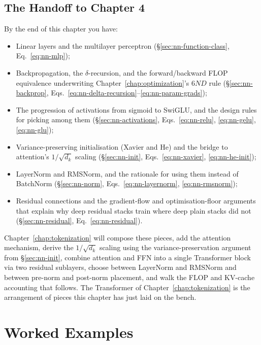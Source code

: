 \subsection{The Handoff to Chapter 4}

By the end of this chapter you have:

\begin{itemize}
  \item Linear layers and the multilayer perceptron
        (\S\ref{sec:nn-function-class}, Eq.~\ref{eq:nn-mlp});
  \item Backpropagation, the $\delta$-recursion, and the
        forward/backward FLOP equivalence underwriting
        Chapter~\ref{chap:optimization}'s $6ND$ rule
        (\S\ref{sec:nn-backprop},
        Eqs.~\ref{eq:nn-delta-recursion}--\ref{eq:nn-param-grads});
  \item The progression of activations from sigmoid to SwiGLU,
        and the design rules for picking among them
        (\S\ref{sec:nn-activations}, Eqs.~\ref{eq:nn-relu},
        \ref{eq:nn-gelu}, \ref{eq:nn-glu});
  \item Variance-preserving initialisation (Xavier and He) and
        the bridge to attention's $1/\sqrt{d_k}$ scaling
        (\S\ref{sec:nn-init}, Eqs.~\ref{eq:nn-xavier},
        \ref{eq:nn-he-init});
  \item LayerNorm and RMSNorm, and the rationale for using them
        instead of BatchNorm
        (\S\ref{sec:nn-norm}, Eqs.~\ref{eq:nn-layernorm},
        \ref{eq:nn-rmsnorm});
  \item Residual connections and the gradient-flow and
        optimisation-floor arguments that explain why deep
        residual stacks train where deep plain stacks did not
        (\S\ref{sec:nn-residual}, Eq.~\ref{eq:nn-residual}).
\end{itemize}

Chapter~\ref{chap:tokenization} will compose these pieces, add the attention
mechanism, derive the $1/\sqrt{d_k}$ scaling using the
variance-preservation argument from \S\ref{sec:nn-init},
combine attention and FFN into a single Transformer block via
two residual sublayers, choose between LayerNorm and RMSNorm and
between pre-norm and post-norm placement, and walk the FLOP and
KV-cache accounting that follows. The Transformer of Chapter~\ref{chap:tokenization}
is the arrangement of pieces this chapter has just laid on the
bench.


\section{Worked Examples}
\label{sec:nn-worked-examples}

